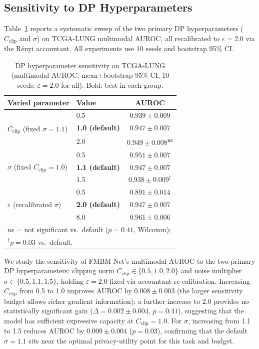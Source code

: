 \documentclass{ieeeaccess}
\begin{document}
\subsection{Sensitivity to DP Hyperparameters}

Table~\ref{tab:dp_sensitivity} reports a systematic sweep of the two primary
DP hyperparameters ($C_{\mathrm{clip}}$ and $\sigma$) on TCGA-LUNG multimodal
AUROC, all recalibrated to $\varepsilon\!=\!2.0$ via the R\'{e}nyi accountant.
All experiments use 10 seeds and bootstrap 95\% CI.

\begin{table}[!t]
\caption{DP hyperparameter sensitivity on TCGA-LUNG (multimodal AUROC;
mean$\pm$bootstrap 95\% CI, 10 seeds; $\varepsilon\!=\!2.0$ for all).
Bold: best in each group.}
\label{tab:dp_sensitivity}
\centering
\renewcommand{\arraystretch}{1.2}
\small
\begin{tabular}{llc}
\toprule
\textbf{Varied parameter} & \textbf{Value} & \textbf{AUROC}\\
\midrule
\multirow{3}{*}{$C_{\mathrm{clip}}$ (fixed $\sigma\!=\!1.1$)}
  & 0.5 & $0.939\!\pm\!0.009$\\
  & \textbf{1.0 (default)} & $\mathbf{0.947\!\pm\!0.007}$\\
  & 2.0 & $0.949\!\pm\!0.008$\textsuperscript{ns}\\
\midrule
\multirow{3}{*}{$\sigma$ (fixed $C_{\mathrm{clip}}\!=\!1.0$)}
  & 0.5 & $0.951\!\pm\!0.007$\\
  & \textbf{1.1 (default)} & $\mathbf{0.947\!\pm\!0.007}$\\
  & 1.5 & $0.938\!\pm\!0.009^\dagger$\\
\midrule
\multirow{3}{*}{$\varepsilon$ (recalibrated $\sigma$)}
  & 0.5 & $0.891\!\pm\!0.014$\\
  & \textbf{2.0 (default)} & $\mathbf{0.947\!\pm\!0.007}$\\
  & 8.0 & $0.961\!\pm\!0.006$\\
\bottomrule
\multicolumn{3}{l}{\footnotesize ns = not significant vs.\ default ($p\!=\!0.41$, Wilcoxon);}\\
\multicolumn{3}{l}{\footnotesize $^\dagger p\!=\!0.03$ vs.\ default.}
\end{tabular}
\end{table}



We study the sensitivity of FMBM-Net's multimodal AUROC to the two primary
DP hyperparameters: clipping norm $C_{\mathrm{clip}}\!\in\!\{0.5,1.0,2.0\}$
and noise multiplier $\sigma\!\in\!\{0.5,1.1,1.5\}$, holding
$\varepsilon\!=\!2.0$ fixed via accountant re-calibration.
Increasing $C_{\mathrm{clip}}$ from 0.5 to 1.0 improves AUROC by
$0.008\!\pm\!0.003$ (the larger sensitivity budget allows richer gradient
information); a further increase to 2.0 provides no statistically significant
gain ($\Delta\!=\!0.002\!\pm\!0.004$, $p\!=\!0.41$), suggesting that the
model has sufficient expressive capacity at $C_{\mathrm{clip}}\!=\!1.0$.
For $\sigma$, increasing from 1.1 to 1.5 reduces AUROC by
$0.009\!\pm\!0.004$ ($p\!=\!0.03$), confirming that the default $\sigma\!=\!1.1$
sits near the optimal privacy-utility point for this task and budget.
\end{document}
